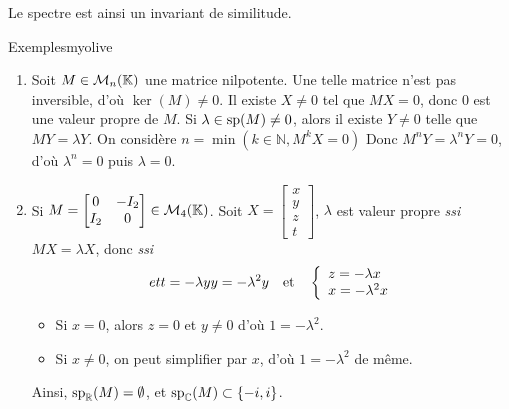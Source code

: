     Le spectre est ainsi un invariant de similitude.

    \begin{omed}{Exemples}{myolive}
        \begin{enumerate}[label=\arabic*.]
            \item Soit $M \in \mk{n}$ une matrice nilpotente. Une telle matrice n’est pas inversible, d’où $\ker(M) \neq 0$. Il existe $X \neq 0$ tel que $M X = 0$, donc $0$ est une valeur propre de $M$. Si $\lambda \in \sp(M) \neq 0$, alors il existe $Y \neq 0$ telle que $MY = \lambda Y$. On considère $n = \min(k \in \mathbb{N}, M^k X = 0)$ Donc $M^n Y = \lambda^n Y = 0$, d’où $\lambda^n = 0$ puis $\lambda = 0$.
            \item Si $M = \begin{bmatrix}
                0 & -I_2 \\
                I_2 & 0
            \end{bmatrix} \in \mk{4}$. Soit $X = \begin{bmatrix}
                x \\
                y \\
                z \\
                t
            \end{bmatrix}$, $\lambda$ est valeur propre \textit{ssi} $MX = \lambda X$, donc \textit{ssi} 
            \[et{t = -\lambda y}{y = -\lambda^2 y} \esp{et} \et{z = -\lambda x}{x = - \lambda^2 x}\]
            \begin{itemize}
                \item Si $x = 0$, alors $z = 0$ et $y \neq 0$ d’où $1 = - \lambda^2$.
                \item Si $x \neq 0$, on peut simplifier par $x$, d’où $1 = - \lambda^2$ de même.
            \end{itemize}
            Ainsi, $\sp_{\mathbb{R}}(M) = \emptyset$, et $\sp_{\mathbb{C}}(M) \subset \left\{-i, i\right\}$.
\end{enumerate}
\end{omed}
